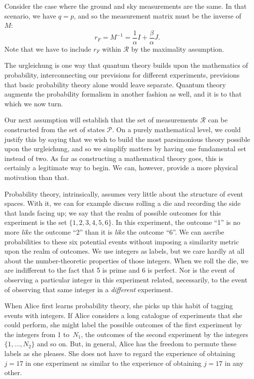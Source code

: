 \documentclass[aps,pra,superscriptaddress,10pt,tightenlines,twocolumn,nofootinbib]{revtex4}
\theoremstyle{remark}
\newcommand{\cP}{\mathcal{P}}
\newcommand{\cR}{\mathcal{R}}
\begin{document}
Consider the case where the ground and sky measurements are the same.
In that scenario, we have ${q} = {p}$, and so the measurement
matrix must be the inverse of~$M$:
\begin{equation}
r_F = M^{-1} = \frac{1}{\alpha}I + \frac{\beta}{\alpha}J.
\label{eq:r_F}
\end{equation}
Note that we have to include $r_F$ within $\cR$ by the maximality assumption.

The urgleichung is one way that quantum theory builds upon the
mathematics of probability, interconnecting our previsions for
different experiments, previsions that basic probability theory alone
would leave separate.  Quantum theory augments the probability
formalism in another fashion as well, and it is to that which we now
turn.

Our next assumption will establish that the set of measurements $\cR$
can be constructed from the set of states $\cP$.  On a purely
mathematical level, we could justify this by saying that we wish to
build the most parsimonious theory possible upon the urgleichung, and
so we simplify matters by having one fundamental set instead of two.
As far as constructing a mathematical theory goes, this is certainly a
legitimate way to begin.  We can, however, provide a more physical
motivation than that.

Probability theory, intrinsically, assumes very little about the
structure of event spaces.  With it, we can for example discuss
rolling a die and recording the side that lands facing up; we say that
the realm of possible outcomes for this experiment is the set
$\{1,2,3,4,5,6\}$.  In this experiment, the outcome ``1'' is no more
\emph{like} the outcome ``2'' than it is \emph{like} the outcome
``6''.  We can ascribe probabilities to these six potential events
without imposing a similarity metric upon the realm of outcomes.  We
use integers as labels, but we care hardly at all about the
number-theoretic properties of those integers.  When we roll the die,
we are indifferent to the fact that 5 is prime and 6 is perfect.  Nor
is the event of observing a particular integer in this experiment
related, necessarily, to the event of observing that same integer in a
\emph{different} experiment.

When Alice first learns probability theory, she picks up this habit of
tagging events with integers.  If Alice considers a long catalogue of
experiments that she could perform, she might label the possible
outcomes of the first experiment by the integers from 1 to~$N_1$, the
outcomes of the second experiment by the integers $\{1,\ldots,N_2\}$
and so on.  But, in general, Alice has the freedom to permute these
labels as she pleases.  She does not have to regard the experience of
obtaining $j = 17$ in one experiment as similar to the experience of
obtaining $j = 17$ in any other.
\end{document}

